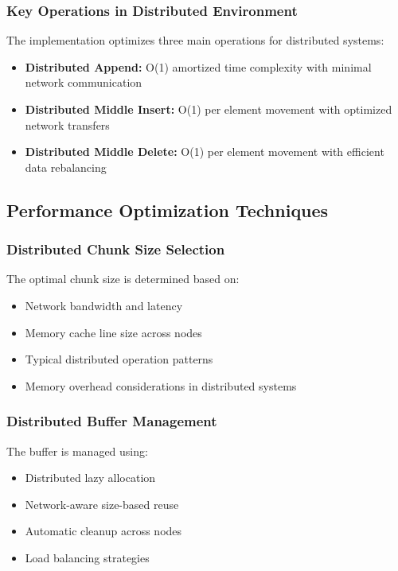 \subsubsection{Key Operations in Distributed Environment}

The implementation optimizes three main operations for distributed systems:
\begin{itemize}
    \item \textbf{Distributed Append:} O(1) amortized time complexity with minimal network communication
    \item \textbf{Distributed Middle Insert:} O(1) per element movement with optimized network transfers
    \item \textbf{Distributed Middle Delete:} O(1) per element movement with efficient data rebalancing
\end{itemize}

\subsection{Performance Optimization Techniques}

\subsubsection{Distributed Chunk Size Selection}

The optimal chunk size is determined based on:
\begin{itemize}
    \item Network bandwidth and latency
    \item Memory cache line size across nodes
    \item Typical distributed operation patterns
    \item Memory overhead considerations in distributed systems
\end{itemize}

\subsubsection{Distributed Buffer Management}

The buffer is managed using:
\begin{itemize}
    \item Distributed lazy allocation
    \item Network-aware size-based reuse
    \item Automatic cleanup across nodes
    \item Load balancing strategies
\end{itemize}

